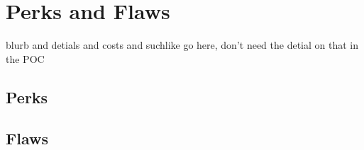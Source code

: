 
\section{Perks and Flaws}
blurb and detials and costs and suchlike go here, don't need the detial on that in the POC
\newpage\subsection{Perks}
\begin{multicols}{2}






\end{multicols}
\newpage\subsection{Flaws}
\begin{multicols}{2}

\end{multicols}
